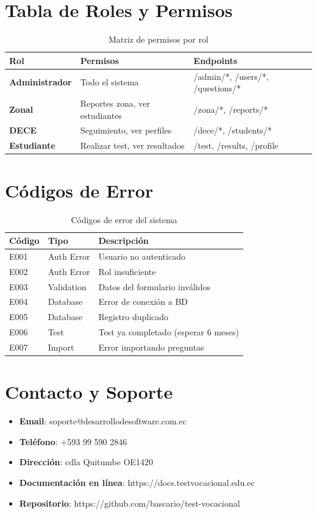 \documentclass[12pt, a4paper]{report}
\begin{document}
\section{Tabla de Roles y Permisos}
\begin{table}[H]
\centering
\begin{tabularx}{\textwidth}{|l|l|l|}
\hline
\textbf{Rol} & \textbf{Permisos} & \textbf{Endpoints} \\
\hline
\textbf{Administrador} & Todo el sistema & /admin/*, /users/*, /questions/* \\
\hline
\textbf{Zonal} & Reportes zona, ver estudiantes & /zona/*, /reports/* \\
\hline
\textbf{DECE} & Seguimiento, ver perfiles & /dece/*, /students/* \\
\hline
\textbf{Estudiante} & Realizar test, ver resultados & /test, /results, /profile \\
\hline
\end{tabularx}
\caption{Matriz de permisos por rol}
\end{table}

\section{Códigos de Error}
\begin{table}[H]
\centering
\begin{tabularx}{\textwidth}{|l|l|X|}
\hline
\textbf{Código} & \textbf{Tipo} & \textbf{Descripción} \\
\hline
E001 & Auth Error & Usuario no autenticado \\
\hline
E002 & Auth Error & Rol insuficiente \\
\hline
E003 & Validation & Datos del formulario inválidos \\
\hline
E004 & Database & Error de conexión a BD \\
\hline
E005 & Database & Registro duplicado \\
\hline
E006 & Test & Test ya completado (esperar 6 meses) \\
\hline
E007 & Import & Error importando preguntas \\
\hline
\end{tabularx}
\caption{Códigos de error del sistema}
\end{table}

\section{Contacto y Soporte}
\begin{itemize}
    \item \textbf{Email}: soporte@desarrollodesoftware.com.ec
    \item \textbf{Teléfono}: +593 99 590 2846
    \item \textbf{Dirección}: cdla Quitumbe OE1420 
    \item \textbf{Documentación en línea}: https://docs.testvocacional.edu.ec
    \item \textbf{Repositorio}: https://github.com/bascario/test-vocacional
\end{itemize}
\end{document}
